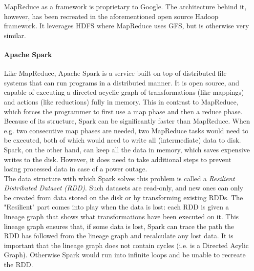 MapReduce as a framework is proprietary to Google. The architecture behind it, however, has been recreated in the aforementioned open source Hadoop framework. It leverages HDFS where MapReduce uses GFS, but is otherwise very similar.

\paragraph{Apache Spark}
Like MapReduce, Apache Spark is a service built on top of distributed file systems that can run programs in a distributed manner. It is open source, and capable of executing a directed acyclic graph of transformations (like mappings) and actions (like reductions) fully in memory\cite{Sparkwebsite}. This in contrast to MapReduce, which forces the programmer to first use a map phase and then a reduce phase. Because of its structure, Spark can be significantly faster than MapReduce. When e.g. two consecutive map phases are needed, two MapReduce tasks would need to be executed, both of which would need to write all (intermediate) data to disk. Spark, on the other hand, can keep all the data in memory, which saves expensive writes to the disk. However, it does need to take additional steps to prevent losing processed data in case of a power outage.\\

The data structure with which Spark solves this problem is called a \textit{Resilient Distributed Dataset (RDD)}. Such datasets are read-only, and new ones can only be created from data stored on the disk or by transforming existing RDDs\cite{Zaha12}. The "Resilient" part comes into play when the data is lost: each RDD is given a lineage graph that shows what transformations have been executed on it. This lineage graph ensures that, if some data is lost, Spark can trace the path the RDD has followed from the lineage graph and recalculate any lost data. It is important that the lineage graph does not contain cycles (i.e. is a Directed Acylic Graph). Otherwise Spark would run into infinite loops and be unable to recreate the RDD.
